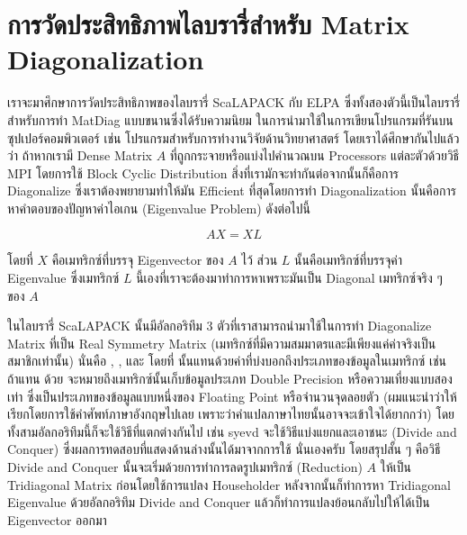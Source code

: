 \section{การวัดประสิทธิภาพไลบรารี่สำหรับ Matrix Diagonalization}

เราจะมาศึกษาการวัดประสิทธิภาพของไลบรารี่ ScaLAPACK กับ ELPA ซึ่งทั้งสองตัวนี้เป็นไลบรารี่สำหรับการทำ MatDiag แบบขนานซึ่งได้รับความนิยม%
ในการนำมาใช้ในการเขียนโปรแกรมที่รันบนซุปเปอร์คอมพิวเตอร์ เช่น โปรแกรมสำหรับการทำงานวิจัยด้านวิทยาศาสตร์ โดยเราได้ศึกษากันไปแล้วว่า%
ถ้าหากเรามี Dense Matrix $A$ ที่ถูกกระจายหรือแบ่งไปคำนวณบน Processors แต่ละตัวด้วยวิธี MPI โดยการใช้ Block Cyclic Distribution
สิ่งที่เรามักจะทำกันต่อจากนั้นก็คือการ Diagonalize ซึ่งเราต้องพยายามทำให้มัน Efficient ที่สุดโดยการทำ Diagonalization
นั้นคือการหาคำตอบของปัญหาค่าไอเกน (Eigenvalue Problem) ดังต่อไปนี้

\begin{equation}
  AX
  =
  XL
\end{equation}

\noindent โดยที่ $X$ คือเมทริกซ์ที่บรรจุ Eigenvector ของ $A$ ไว้ ส่วน $L$ นั้นคือเมทริกซ์ที่บรรจุค่า Eigenvalue ซึ่งเมทริกซ์ $L$
นี้เองที่เราจะต้องมาทำการหาเพราะมันเป็น Diagonal เมทริกซ์จริง ๆ ของ $A$

ในไลบรารี่ ScaLAPACK นั้นมีอัลกอริทึม 3 ตัวที่เราสามารถนำมาใช้ในการทำ Diagonalize Matrix ที่เป็น Real Symmetry Matrix
(เมทริกซ์ที่มีความสมมาตรและมีเพียงแค่ค่าจริงเป็นสมาชิกเท่านั้น) นั่นคือ , ,
และ  โดยที่  นั้นแทนด้วยค่าที่บ่งบอกถึงประเภทของข้อมูลในเมทริกซ์ เช่น ถ้าแทน
 ด้วย  จะหมายถึงเมทริกซ์นั้นเก็บข้อมูลประเภท Double Precision หรือความเที่ยงแบบสองเท่า%
ซึ่งเป็นประเภทของข้อมูลแบบหนึ่งของ Floating Point หรือจำนวนจุดลอยตัว (ผมแนะนำว่าให้เรียกโดยการใช้คำศัพท์ภาษาอังกฤษไปเลย
เพราะว่าคำแปลภาษาไทยนั้นอาจจะเข้าใจได้ยากกว่า) โดยทั้งสามอัลกอริทึมนี้ก็จะใช้วิธีที่แตกต่างกันไป เช่น syevd จะใช้วิธีแบ่งแยกและเอาชนะ
(Divide and Conquer) ซึ่งผลการทดสอบที่แสดงด้านล่างนั้นได้มาจากการใช้  นั่นเองครับ โดยสรุปสั้น ๆ คือวิธี
Divide and Conquer นั้นจะเริ่มด้วยการทำการลดรูปเมทริกซ์ (Reduction) $A$ ให้เป็น Tridiagonal Matrix ก่อนโดยใช้การแปลง
Householder หลังจากนั้นก็ทำการหา Tridiagonal Eigenvalue ด้วยอัลกอริทึม Divide and Conquer แล้วก็ทำการแปลงย้อนกลับไปให้ได้เป็น
Eigenvector ออกมา

